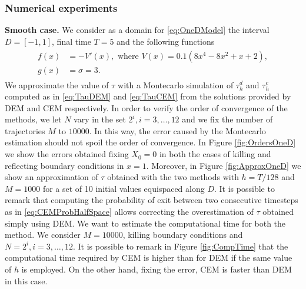 \subsubsection{Numerical experiments}

\textbf{Smooth case.} We consider as a domain for \eqref{eq:OneDModel} the interval $D = \left[-1,1\right]$, final time $T = 5$ and the following functions
\begin{align}\label{eq:FunctionsOneDSmooth}
\begin{split}
	f(x) &= -V'(x), \text{ where } V(x) = 0.1(8x^4 - 8x^2 + x + 2), \\
	g(x) &= \sigma = 3.
\end{split}
\end{align}
We approximate the value of $\tau$ with a Montecarlo simulation of $\tau_h^d$ and $\tau_h^c$ computed as in \eqref{eq:TauDEM} and \eqref{eq:TauCEM} from the solutions provided by DEM and CEM respectively. In order to verify the order of convergence of the methods, we let $N$ vary in the set $2^i,i=3,\dots,12$ and we fix the number of trajectories $M$ to $10000$. In this way, the error caused by the Montecarlo estimation should not spoil the order of convergence. In Figure \ref{fig:OrdersOneD} we show the errors obtained fixing $X_0 = 0$ in both the cases of killing and reflecting boundary conditions in $x = 1$. Moreover, in Figure \ref{fig:ApproxOneD} we show an approximation of $\tau$ obtained with the two methods with $h = T/128$ and $M = 1000$ for a set of 10 initial values equispaced along $D$. It is possible to remark that computing the probability of exit between two consecutive timesteps as in \eqref{eq:CEMProbHalfSpace} allows correcting the overestimation of $\tau$ obtained simply using DEM. We want to estimate the computational time for both the method. We consider $M = 10000$, killing boundary conditions and $N = 2^i, i = 3,\dots,12$. It is possible to remark in Figure \ref{fig:CompTime} that the computational time required by CEM is higher than for DEM if the same value of $h$ is employed. On the other hand, fixing the error, CEM is faster than DEM in this case.



